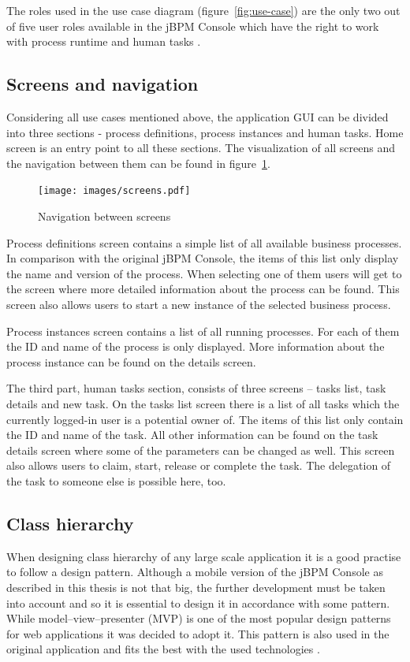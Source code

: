 \documentclass[12pt,oneside,final]{fithesis2}
\begin{document}
The roles used in the use case diagram (figure~\ref{fig:use-case}) are the only two out of five user roles available in the jBPM Console which have the right to work with process runtime and human tasks \cite{jbpm6roles}.

\subsection{Screens and navigation}
Considering all use cases mentioned above, the application GUI can be divided into three sections - process definitions, process instances and human tasks.
Home screen is an entry point to all these sections.
The visualization of all screens and the navigation between them can be found in figure~\ref{fig:screens}.

\begin{figure}[ht!]
\centering
\texttt{[image: images/screens.pdf]}
\caption{Navigation between screens}
\label{fig:screens}
\end{figure}

Process definitions screen contains a simple list of all available business processes.
In comparison with the original jBPM Console, the items of this list only display the name and version of the process.
When selecting one of them users will get to the screen where more detailed information about the process can be found.
This screen also allows users to start a new instance of the selected business process.

Process instances screen contains a list of all running processes.
For each of them the ID and name of the process is only displayed.
More information about the process instance can be found on the details screen.

The third part, human tasks section, consists of three screens -- tasks list, task details and new task.
On the tasks list screen there is a list of all tasks which the currently logged-in user is a potential owner of\footnotemark{}.
The items of this list only contain the ID and name of the task.
All other information can be found on the task details screen where some of the parameters can be changed as well.
This screen also allows users to claim, start, release or complete the task.
The delegation of the task to someone else is possible here, too.

\subsection{Class hierarchy}
When designing class hierarchy of any large scale application it is a good practise to follow a design pattern.
Although a mobile version of the jBPM Console as described in this thesis is not that big, the further development must be taken into account and so it is essential to design it in accordance with some pattern.
While model–view–presenter (MVP) is one of the most popular design patterns for web applications it was decided to adopt it.
This pattern is also used in the original application and fits the best with the used technologies \cite{ramsdale10}.
\end{document}
